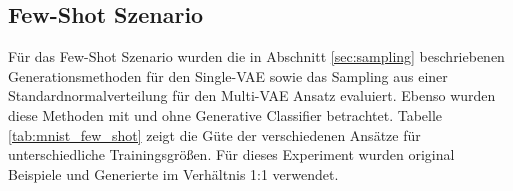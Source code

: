 \subsection{Few-Shot Szenario}\label{sec:mnist_few_shot}
Für das Few-Shot Szenario wurden die in Abschnitt \ref{sec:sampling} beschriebenen Generationsmethoden für den Single-VAE sowie das Sampling aus einer Standardnormalverteilung für den Multi-VAE Ansatz evaluiert. Ebenso wurden diese Methoden mit und ohne Generative Classifier betrachtet. Tabelle \ref{tab:mnist_few_shot} zeigt die Güte der verschiedenen Ansätze für unterschiedliche Trainingsgrößen. Für dieses Experiment wurden original Beispiele und Generierte im Verhältnis 1:1 verwendet.
\begin{table}[hbt]
\centering
{}
\end{table}
